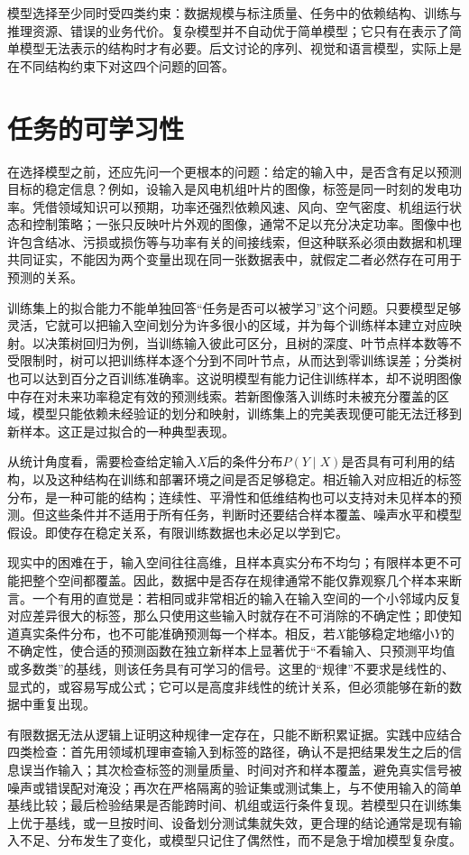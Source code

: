 模型选择至少同时受四类约束：数据规模与标注质量、任务中的依赖结构、训练与推理资源、错误的业务代价。复杂模型并不自动优于简单模型；它只有在表示了简单模型无法表示的结构时才有必要。后文讨论的序列、视觉和语言模型，实际上是在不同结构约束下对这四个问题的回答。


\section{任务的可学习性}
在选择模型之前，还应先问一个更根本的问题：给定的输入中，是否含有足以预测目标的稳定信息？例如，设输入是风电机组叶片的图像，标签是同一时刻的发电功率。凭借领域知识可以预期，功率还强烈依赖风速、风向、空气密度、机组运行状态和控制策略；一张只反映叶片外观的图像，通常不足以充分决定功率。图像中也许包含结冰、污损或损伤等与功率有关的间接线索，但这种联系必须由数据和机理共同证实，不能因为两个变量出现在同一张数据表中，就假定二者必然存在可用于预测的关系。

训练集上的拟合能力不能单独回答“任务是否可以被学习”这个问题。只要模型足够灵活，它就可以把输入空间划分为许多很小的区域，并为每个训练样本建立对应映射。以决策树回归为例，当训练输入彼此可区分，且树的深度、叶节点样本数等不受限制时，树可以把训练样本逐个分到不同叶节点，从而达到零训练误差；分类树也可以达到百分之百训练准确率。这说明模型有能力记住训练样本，却不说明图像中存在对未来功率稳定有效的预测线索。若新图像落入训练时未被充分覆盖的区域，模型只能依赖未经验证的划分和映射，训练集上的完美表现便可能无法迁移到新样本。这正是过拟合的一种典型表现。

从统计角度看，需要检查给定输入$X$后的条件分布$P(Y\mid X)$是否具有可利用的结构，以及这种结构在训练和部署环境之间是否足够稳定。相近输入对应相近的标签分布，是一种可能的结构；连续性、平滑性和低维结构也可以支持对未见样本的预测。但这些条件并不适用于所有任务，判断时还要结合样本覆盖、噪声水平和模型假设。即使存在稳定关系，有限训练数据也未必足以学到它。

现实中的困难在于，输入空间往往高维，且样本真实分布不均匀；有限样本更不可能把整个空间都覆盖。因此，数据中是否存在规律通常不能仅靠观察几个样本来断言。一个有用的直觉是：若相同或非常相近的输入在输入空间的一个小邻域内反复对应差异很大的标签，那么只使用这些输入时就存在不可消除的不确定性；即使知道真实条件分布，也不可能准确预测每一个样本。相反，若$X$能够稳定地缩小$Y$的不确定性，使合适的预测函数在独立新样本上显著优于“不看输入、只预测平均值或多数类”的基线，则该任务具有可学习的信号。这里的“规律”不要求是线性的、显式的，或容易写成公式；它可以是高度非线性的统计关系，但必须能够在新的数据中重复出现。

有限数据无法从逻辑上证明这种规律一定存在，只能不断积累证据。实践中应结合四类检查：首先用领域机理审查输入到标签的路径，确认不是把结果发生之后的信息误当作输入；其次检查标签的测量质量、时间对齐和样本覆盖，避免真实信号被噪声或错误配对淹没；再次在严格隔离的验证集或测试集上，与不使用输入的简单基线比较；最后检验结果是否能跨时间、机组或运行条件复现。若模型只在训练集上优于基线，或一旦按时间、设备划分测试集就失效，更合理的结论通常是现有输入不足、分布发生了变化，或模型只记住了偶然性，而不是急于增加模型复杂度。

